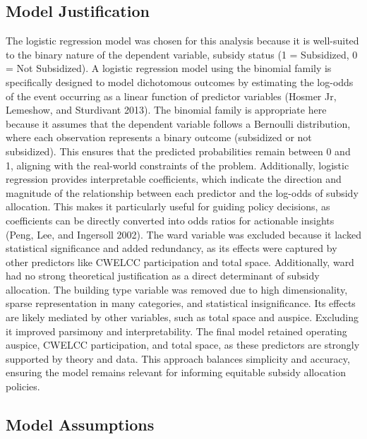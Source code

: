 \documentclass[
  letterpaper,
  DIV=11,
  numbers=noendperiod]{scrartcl}
\begin{document}
\subsection{Model Justification}\label{model-justification}

The logistic regression model was chosen for this analysis because it is
well-suited to the binary nature of the dependent variable, subsidy
status (1 = Subsidized, 0 = Not Subsidized). A logistic regression model
using the binomial family is specifically designed to model dichotomous
outcomes by estimating the log-odds of the event occurring as a linear
function of predictor variables (Hosmer Jr, Lemeshow, and Sturdivant
2013). The binomial family is appropriate here because it assumes that
the dependent variable follows a Bernoulli distribution, where each
observation represents a binary outcome (subsidized or not subsidized).
This ensures that the predicted probabilities remain between 0 and 1,
aligning with the real-world constraints of the problem. Additionally,
logistic regression provides interpretable coefficients, which indicate
the direction and magnitude of the relationship between each predictor
and the log-odds of subsidy allocation. This makes it particularly
useful for guiding policy decisions, as coefficients can be directly
converted into odds ratios for actionable insights (Peng, Lee, and
Ingersoll 2002). The ward variable was excluded because it lacked
statistical significance and added redundancy, as its effects were
captured by other predictors like CWELCC participation and total space.
Additionally, ward had no strong theoretical justification as a direct
determinant of subsidy allocation. The building type variable was
removed due to high dimensionality, sparse representation in many
categories, and statistical insignificance. Its effects are likely
mediated by other variables, such as total space and auspice. Excluding
it improved parsimony and interpretability. The final model retained
operating auspice, CWELCC participation, and total space, as these
predictors are strongly supported by theory and data. This approach
balances simplicity and accuracy, ensuring the model remains relevant
for informing equitable subsidy allocation policies.

\subsection{Model Assumptions}\label{model-assumptions}
\end{document}
